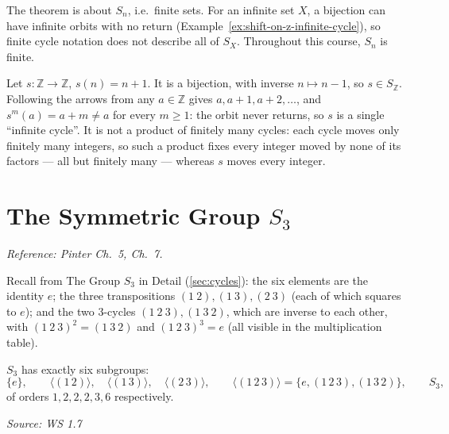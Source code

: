 \documentclass[11pt]{report}
\newcommand{\srcline}[1]{\par\hfill{\footnotesize\textit{Source: #1}}}
\begin{document}
\begin{rembox}\label{rem:finite-sets-only}
The theorem is about $S_n$, i.e.\ finite sets. For an infinite set $X$, a bijection can have infinite orbits with no return (Example~\ref{ex:shift-on-z-infinite-cycle}), so finite cycle notation does not describe all of $S_X$. Throughout this course, $S_n$ is finite.
\end{rembox}

\begin{exbox}\label{ex:shift-on-z-infinite-cycle}
Let $s \colon \mathbb{Z} \to \mathbb{Z}$, $s(n) = n + 1$. It is a bijection, with inverse $n \mapsto n - 1$, so $s \in S_{\mathbb{Z}}$. Following the arrows from any $a \in \mathbb{Z}$ gives $a, a + 1, a + 2, \ldots$, and $s^m(a) = a + m \neq a$ for every $m \geq 1$: the orbit never returns, so $s$ is a single ``infinite cycle''. It is not a product of finitely many cycles: each cycle moves only finitely many integers, so such a product fixes every integer moved by none of its factors --- all but finitely many --- whereas $s$ moves every integer.
\end{exbox}

\section{\texorpdfstring{The Symmetric Group $S_3$}{The Symmetric Group S₃}}\label{sec:s3-subgroups}

\textit{Reference: Pinter Ch.\ 5, Ch.\ 7.}


Recall from The Group $S_3$ in Detail (\ref{sec:cycles}): the six elements are the identity $e$; the three transpositions $(1\ 2), (1\ 3), (2\ 3)$ (each of which squares to $e$); and the two $3$-cycles $(1\ 2\ 3), (1\ 3\ 2)$, which are inverse to each other, with $(1\ 2\ 3)^2 = (1\ 3\ 2)$ and $(1\ 2\ 3)^3 = e$ (all visible in the multiplication table).

\begin{propbox}[{Subgroups of $S_3$}]\label{prop:subgroups-s3}
$S_3$ has exactly six subgroups:
\[ \{e\}, \qquad \langle (1\,2) \rangle, \quad \langle (1\,3) \rangle, \quad \langle (2\,3) \rangle, \qquad \langle (1\,2\,3) \rangle = \{e, (1\,2\,3), (1\,3\,2)\}, \qquad S_3, \]
of orders $1, 2, 2, 2, 3, 6$ respectively.
\srcline{WS 1.7}
\end{propbox}
\end{document}
